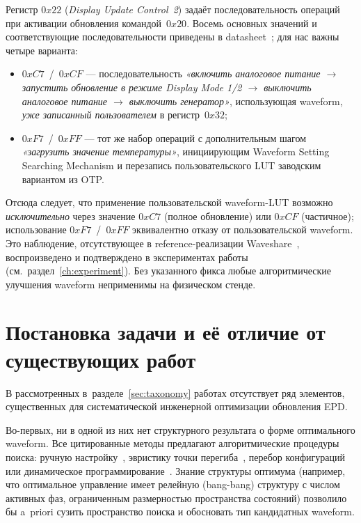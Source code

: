 Регистр $0x22$ (\emph{Display Update Control~2}) задаёт последовательность
операций при активации обновления командой~$0x20$. Восемь основных значений и
соответствующие последовательности приведены в
datasheet~\cite{ssd1680_datasheet}; для нас важны четыре варианта:

\begin{itemize}
    \item $0x{}C7$~/~$0x{}CF$ — последовательность \emph{«включить аналоговое
    питание $\to$ запустить обновление в режиме Display Mode 1/2 $\to$ выключить
    аналоговое питание $\to$ выключить генератор»}, использующая waveform,
    \emph{уже записанный пользователем} в регистр~$0x32$;
    \item $0x{}F7$~/~$0x{}FF$ — тот же набор операций с дополнительным шагом
    \emph{«загрузить значение температуры»}, инициирующим Waveform Setting
    Searching Mechanism и перезапись пользовательского LUT заводским вариантом
    из OTP.
\end{itemize}

Отсюда следует, что применение пользовательской waveform-LUT возможно
\emph{исключительно} через значение $0x{}C7$ (полное обновление) или $0x{}CF$
(частичное); использование $0x{}F7$~/~$0x{}FF$ эквивалентно отказу от
пользовательской waveform. Это наблюдение, отсутствующее в reference-реализации
Waveshare~\cite{waveshareteam_epaper}, воспроизведено и подтверждено в
экспериментах работы (см.~раздел~\ref{ch:experiment}). Без указанного фикса
любые алгоритмические улучшения waveform неприменимы на физическом стенде.


\section{Постановка задачи и её отличие от существующих работ}\label{sec:gap}

В рассмотренных в~разделе~\ref{sec:taxonomy} работах отсутствует ряд элементов,
существенных для систематической инженерной оптимизации обновления EPD.

Во-первых, ни в одной из них нет структурного результата о форме
оптимального waveform. Все цитированные методы предлагают алгоритмические
процедуры поиска: ручную настройку~\cite{wang2022_red_ghost}, эвристику точки
перегиба~\cite{he2020_particle_activation}, перебор
конфигураций~\cite{lin2024_low_power} или динамическое
программирование~\cite{kang2025_dp_waveform}. Знание структуры оптимума
(например, что оптимальное управление имеет релейную (bang-bang) структуру с
числом активных фаз, ограниченным размерностью пространства состояний)
позволило бы a~priori сузить пространство поиска и обосновать тип кандидатных
waveform.

